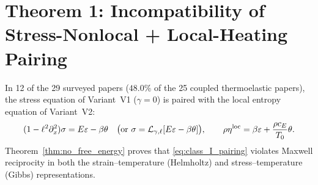 \section{Theorem 1: Incompatibility of Stress-Nonlocal + Local-Heating Pairing}\label{sec:theorem1}

In 12 of the 29 surveyed papers ($48.0\%$ of the 25 coupled thermoelastic papers), the stress equation of Variant~V1 ($\gamma=0$) is paired with the local entropy equation of Variant~V2:
\begin{equation}\label{eq:class_I_pairing}
  (1 - \ell^2\partial_x^2)\sigma = E\varepsilon - \beta\theta \quad \big(\text{or } \sigma = \mathcal{L}_{\gamma,\ell}[E\varepsilon - \beta\theta]\big), \qquad
  \rho\eta^{\mathrm{loc}} = \beta\varepsilon + \frac{\rho c_E}{T_0}\theta.
\end{equation}
Theorem~\ref{thm:no_free_energy} proves that \eqref{eq:class_I_pairing} violates Maxwell reciprocity in both the strain--temperature (Helmholtz) and stress--temperature (Gibbs) representations.

